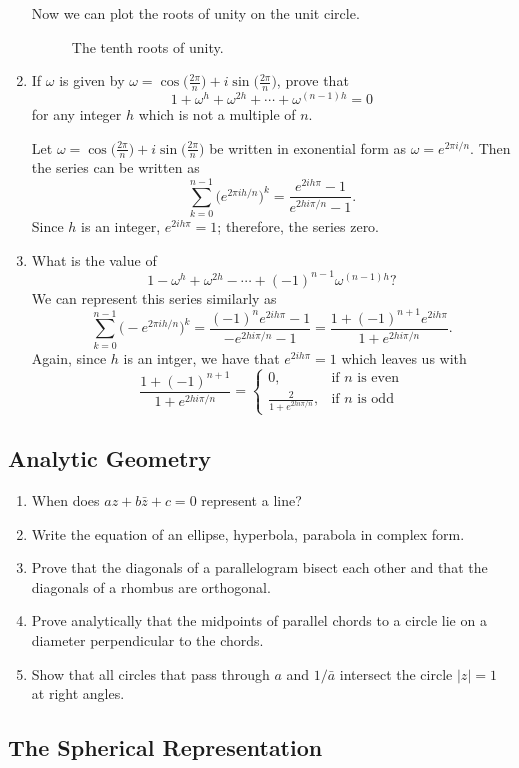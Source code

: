 \begin{enumerate}
  Now we can plot the roots of unity on the unit circle.
  \begin{figure}[H]
    \centering
    
    \caption{The tenth roots of unity.}
  \end{figure}
\item
  If \(\omega\) is given by \(\omega = \cos\bigl(\frac{2\pi}{n}\bigr) +
  i\sin\bigl(\frac{2\pi}{n}\bigr)\), prove that
  \[
  1 + \omega^h + \omega^{2h} + \cdots + \omega^{(n - 1)h} = 0
  \]
  for any integer \(h\) which is not a multiple of \(n\).
  \par\smallskip
  Let \(\omega = \cos\bigl(\frac{2\pi}{n}\bigr) +
  i\sin\bigl(\frac{2\pi}{n}\bigr)\) be written in exonential form as
  \(\omega = e^{2\pi i/n}\).
  Then the series can be written as
  \[
  \sum_{k = 0}^{n - 1}\bigl(e^{2\pi ih/n}\bigr)^k =
  \frac{e^{2ih\pi} - 1}{e^{2hi\pi/n} - 1}.
  \]
  Since \(h\) is an integer, \(e^{2ih\pi} = 1\); therefore, the series zero.
\item
  What is the value of
  \[
  1 - \omega^h + \omega^{2h} - \cdots + (-1)^{n - 1}\omega^{(n - 1)h}\mbox{?}
  \]
  We can represent this series similarly as
  \[
  \sum_{k = 0}^{n - 1}\bigl(-e^{2\pi ih/n}\bigr)^k =
  \frac{(-1)^ne^{2ih\pi} - 1}{-e^{2hi\pi/n} - 1} =
  \frac{1 + (-1)^{n + 1}e^{2ih\pi}}{1 + e^{2hi\pi/n}}.
  \]
  Again, since \(h\) is an intger, we have that \(e^{2ih\pi} = 1\) which leaves
  us with
  \[
  \frac{1 + (-1)^{n + 1}}{1 + e^{2hi\pi/n}} =
  \begin{cases}
    0, & \text{if \(n\) is even}\\
    \frac{2}{1 + e^{2hi\pi/n}}, & \text{if \(n\) is odd}
  \end{cases}
  \]
\end{enumerate}

\subsection{Analytic Geometry}

\begin{enumerate}
\item
  When does \(az + b\bar{z} + c = 0\) represent a line?
\item
  Write the equation of an ellipse, hyperbola, parabola in complex form.
\item
  Prove that the diagonals of a parallelogram bisect each other and that the
  diagonals of a rhombus are orthogonal.
\item
  Prove analytically that the midpoints of parallel chords to a circle lie on a
  diameter perpendicular to the chords.
\item
  Show that all circles that pass through \(a\) and \(1/\bar{a}\) intersect the
  circle \(\lvert z\rvert = 1\) at right angles.
\end{enumerate}

\subsection{The Spherical Representation}

